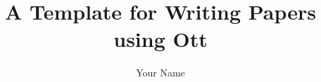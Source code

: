 \documentclass{article}
\title{A Template for Writing Papers using Ott}
\author{Your Name}
\begin{document}
  \maketitle
  \begin{abstract}
    
  \end{abstract}
  
  
  \appendix
  
\end{document}
